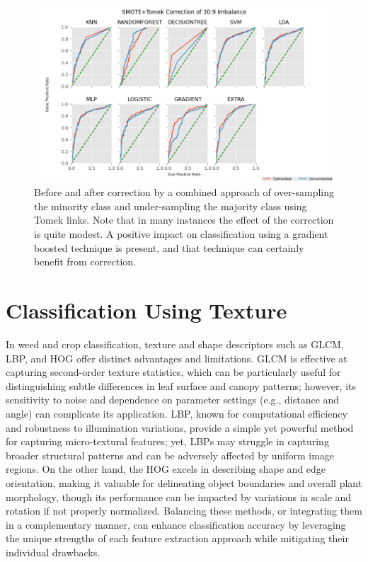 \documentclass[letterpaper, notitlepage]{report}
\begin{document}
\begin{figure}[!htb]
	\centering
	\includegraphics[height=0.40\textheight]{figures/roc-corrected-tomek.png}
	\caption[Before and after correction]{Before and after correction by a combined approach of over-sampling the minority class and under-sampling the majority class using Tomek links. Note that in many instances the effect of the correction is quite modest. A positive impact on classification using a gradient boosted technique is present, and that technique can certainly benefit from correction. }
	\label{fig:auc-tomek}
\end{figure}

\section{Classification Using Texture}
In weed and crop classification, texture and shape descriptors such as \gls{GLCM}, \gls{LBP}, and \gls{HOG} offer distinct advantages and limitations. \gls{GLCM} is effective at capturing second-order texture statistics, which can be particularly useful for distinguishing subtle differences in leaf surface and canopy patterns; however, its sensitivity to noise and dependence on parameter settings (e.g., distance and angle) can complicate its application. LBP, known for computational efficiency and robustness to illumination variations, provide a simple yet powerful method for capturing micro-textural features; yet, LBPs may struggle in capturing broader structural patterns and can be adversely affected by uniform image regions. On the other hand, the \gls{HOG} excels in describing shape and edge orientation, making it valuable for delineating object boundaries and overall plant morphology, though its performance can be impacted by variations in scale and rotation if not properly normalized. Balancing these methods, or integrating them in a complementary manner, can enhance classification accuracy by leveraging the unique strengths of each feature extraction approach while mitigating their individual drawbacks.
%
%
\end{document}
